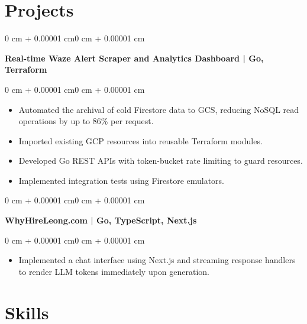 \documentclass[10pt, letterpaper]{article}
\newenvironment{highlights}{
    \begin{itemize}[
        topsep=0.10 cm,
        parsep=0.10 cm,
        partopsep=0pt,
        itemsep=0pt,
        leftmargin=0 cm + 10pt
    ]
}{
    \end{itemize}
}
\newenvironment{onecolentry}{
    \begin{adjustwidth}{0 cm + 0.00001 cm}{0 cm + 0.00001 cm}
}{
    \end{adjustwidth}
}
\begin{document}
\section{Projects}
\vspace{0.1cm}

\begin{onecolentry}
    \textbf{Real-time Waze Alert Scraper and Analytics Dashboard | Go, Terraform}
\end{onecolentry}


\vspace{0.1cm}

\begin{onecolentry}
    \begin{highlights}
        \item Automated the archival of cold Firestore data to GCS, reducing NoSQL read operations by up to 86\% per request.
        \item Imported existing GCP resources into reusable Terraform modules.
        \item Developed Go REST APIs with token-bucket rate limiting to guard resources.
        \item Implemented integration tests using Firestore emulators.

    \end{highlights}
\end{onecolentry}

\vspace{0.2cm}

\begin{onecolentry}
    \textbf{WhyHireLeong.com | Go, TypeScript, Next.js}
\end{onecolentry}

\vspace{0.1cm}

\begin{onecolentry}
    \begin{highlights}
        \item Implemented a chat interface using Next.js and streaming response handlers to render LLM tokens immediately upon generation.
    \end{highlights}
\end{onecolentry}

\section{Skills}
\vspace{0.1cm}
\end{document}
